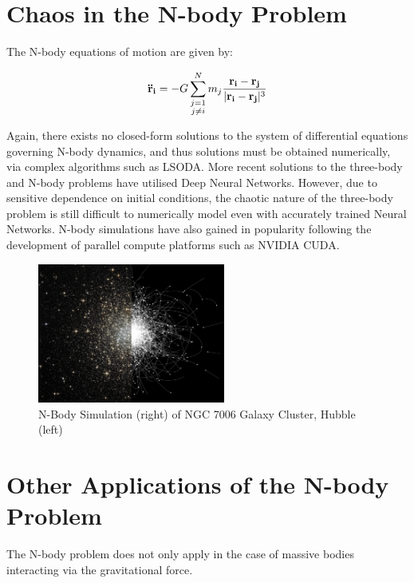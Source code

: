 \documentclass{article}
\begin{document}
\section{Chaos in the N-body Problem}
The N-body equations of motion are given by: 

\begin{equation}
    \mathbf{\Ddot{r}_i} = -G \sum_{\substack{j=1 \\ j\neq i}}^N m_j \frac{\mathbf{r_i}-\mathbf{r_j}}{\lvert\mathbf{r_i}-\mathbf{r_j}\rvert^3}
\end{equation} 

\noindent Again, there exists no closed-form solutions to the system of differential equations governing N-body dynamics, and thus solutions must be obtained numerically, via complex algorithms such as LSODA. More recent solutions to the three-body and N-body problems have utilised Deep Neural Networks. However, due to sensitive dependence on initial conditions, the chaotic nature of the three-body problem is still difficult to numerically model even with accurately trained Neural Networks. N-body simulations have also gained in popularity following the development of parallel compute platforms such as NVIDIA CUDA. 

\begin{figure}[h]
    \centering
    \includegraphics[width=0.55\textwidth]{nbody.png}
    \caption{N-Body Simulation (right) of NGC 7006 Galaxy Cluster, Hubble (left)}
    \label{fig:nbody}
\end{figure}

\section{Other Applications of the N-body Problem}
The N-body problem does not only apply in the case of massive bodies interacting via the gravitational force. 
\end{document}
